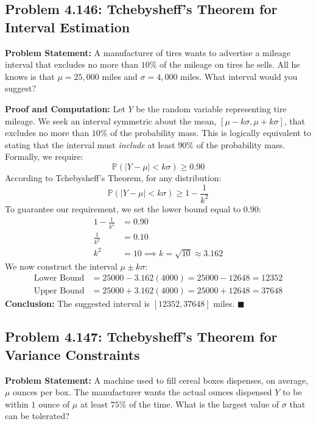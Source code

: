 \documentclass[11pt, a4paper]{article}
\theoremstyle{definition}
\theoremstyle{remark}
\newcommand{\Prob}{\mathbb{P}}
\begin{document}
\subsection{Problem 4.146: Tchebysheff's Theorem for Interval Estimation}
\textbf{Problem Statement:} A manufacturer of tires wants to advertise a mileage interval that excludes no more than $10\%$ of the mileage on tires he sells. All he knows is that $\mu = 25,000$ miles and $\sigma = 4,000$ miles. What interval would you suggest?

\textbf{Proof and Computation:}
Let $Y$ be the random variable representing tire mileage. We seek an interval symmetric about the mean, $[\mu - k\sigma, \mu + k\sigma]$, that excludes no more than $10\%$ of the probability mass. This is logically equivalent to stating that the interval must \textit{include} at least $90\%$ of the probability mass.
Formally, we require:
\[ \Prob(|Y - \mu| < k\sigma) \ge 0.90 \]
According to Tchebysheff's Theorem, for any distribution:
\[ \Prob(|Y - \mu| < k\sigma) \ge 1 - \frac{1}{k^2} \]
To guarantee our requirement, we set the lower bound equal to $0.90$:
\begin{align*}
1 - \frac{1}{k^2} &= 0.90 \\
\frac{1}{k^2} &= 0.10 \\
k^2 &= 10 \implies k = \sqrt{10} \approx 3.162
\end{align*}
We now construct the interval $\mu \pm k\sigma$:
\begin{align*}
\text{Lower Bound} &= 25000 - 3.162(4000) = 25000 - 12648 = 12352 \\
\text{Upper Bound} &= 25000 + 3.162(4000) = 25000 + 12648 = 37648
\end{align*}
\textbf{Conclusion:} The suggested interval is $[12352, 37648]$ miles. $\blacksquare$

\subsection{Problem 4.147: Tchebysheff's Theorem for Variance Constraints}
\textbf{Problem Statement:} A machine used to fill cereal boxes dispenses, on average, $\mu$ ounces per box. The manufacturer wants the actual ounces dispensed $Y$ to be within $1$ ounce of $\mu$ at least $75\%$ of the time. What is the largest value of $\sigma$ that can be tolerated?
\end{document}
